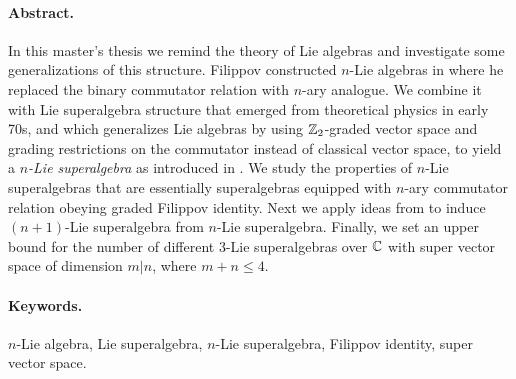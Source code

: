 \paragraph{Abstract.}
    In this master’s thesis we remind the theory of Lie algebras and
    investigate some generalizations of this structure. Filippov constructed
    $n$-Lie algebras in \cite{filippov1985} where he replaced the binary
    commutator relation with $n$-ary analogue. We combine it with
    Lie superalgebra structure that emerged from theoretical
    physics in early 70s, and which generalizes Lie algebras by using
    $\mathbb{Z}_2$-graded vector space and grading restrictions on the commutator
    instead of classical vector space, to yield a \emph{$n$-Lie superalgebra}
    as introduced in \cite{Abramov:2014}.
    We study the properties of $n$-Lie superalgebras that are essentially
    superalgebras equipped with $n$-ary commutator relation obeying graded
    Filippov identity. Next we apply ideas from
    \cite{Abramov:2014,AKMS:2014} to induce $(n+1)$-Lie superalgebra from
    $n$-Lie superalgebra. Finally, we set an upper bound for the number of
    different $3$-Lie superalgebras over $\mathbb{C}$ with super vector space of
    dimension $m|n$, where $m+n \leq 4$.
\paragraph{Keywords.}
    $n$-Lie algebra, Lie superalgebra, $n$-Lie superalgebra,
    Filippov identity, super vector space.